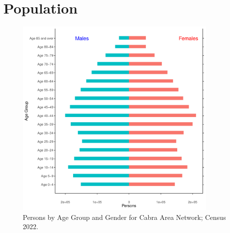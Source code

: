 \documentclass{article}
\begin{document}
\pagebreak

\section{Population} 
\label{sect:Pop}

\begin{figure}[h]
	\centering
	\includegraphics[width = 100mm]{../figures/PyramidPlot.pdf}
	\caption{Persons by Age Group and Gender for Cabra Area Network; Census 2022.}
	\label{fig:2ae19629-1a6a-13a3-e055-000000000001}
	\end{figure}
\end{document}
